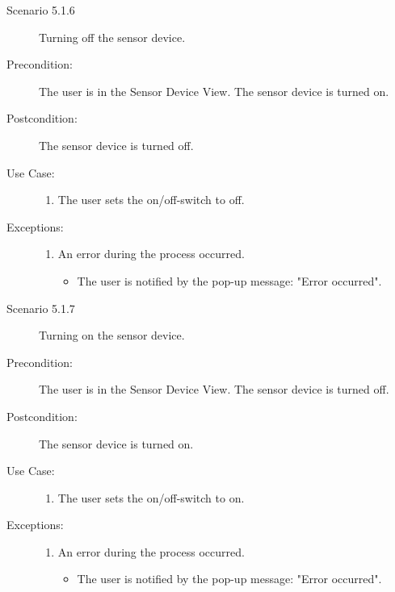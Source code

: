 \documentclass[a4paper]{article}
\begin{document}
\begin{description}
\item[]

\item[Scenario 5.1.6] Turning off the sensor device.
\item[Precondition:] The user is in the Sensor Device View. The sensor device is turned on.
\item[Postcondition:] The sensor device is turned off.
\item[Use Case:]\mbox{}
\begin{enumerate}
\item  The user sets the on/off-switch to off.
\end{enumerate}

\item[Exceptions:]
\item[]
\begin{enumerate}
\item An error during the process occurred.
\begin{itemize}
\item The user is notified by the pop-up message: "Error occurred".
\end{itemize}
\end{enumerate}

\item[]

\item[Scenario 5.1.7] Turning on the sensor device.
\item[Precondition:] The user is in the Sensor Device View. The sensor device is turned off.
\item[Postcondition:] The sensor device is turned on.
\item[Use Case:]\mbox{}
\begin{enumerate}
\item  The user sets the on/off-switch to on.
\end{enumerate}

\item[Exceptions:]
\item[]
\begin{enumerate}
\item An error during the process occurred.
\begin{itemize}
\item The user is notified by the pop-up message: "Error occurred".
\end{itemize}
\end{enumerate}

\item[]


\end{description}
\end{document}
